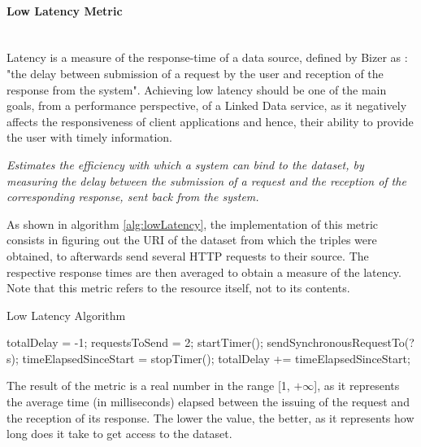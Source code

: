 \paragraph{Low Latency Metric} ~\\ %
Latency is a measure of the response-time of a data source, defined by Bizer as \cite{Bizer2008:PhDThesis:biblatex}: "the delay between submission of a request by the user and reception of the response from the system". Achieving low latency should be one of the main goals, from a performance perspective, of a Linked Data service, as it negatively affects the responsiveness of client applications and hence, their ability to provide the user with timely information.
\begin{mdframed}[style=metricdefinition]
\emph{Estimates the efficiency with which a system can bind to the dataset, by measuring the delay between the submission of a request  and the reception of the corresponding response, sent back from the system.}
\end{mdframed}

As shown in algorithm \ref{alg:lowLatency}, the implementation of this metric consists in figuring out the URI of the dataset from which the triples were obtained, to afterwards send several HTTP requests to their source. The respective response times are then averaged to obtain a measure of the latency. Note that this metric refers to the resource itself, not to its contents.
\begin{algorithm}
\caption{Low Latency Algorithm} \label{alg:lowLatency}
\begin{algorithmic}[1]
\State totalDelay = -1;
\State requestsToSend = 2;
\EndProcedure
{}
\State startTimer();
\State sendSynchronousRequestTo(?s);
\EndFor
\State timeElapsedSinceStart = stopTimer();
\State totalDelay += timeElapsedSinceStart;
\EndIf
{}
\EndProcedure
\end{algorithmic}
\end{algorithm}
The result of the metric is a real number in the range [1, $+\infty$], as it represents the average time (in  milliseconds) elapsed between the issuing of the request and the reception of its response. The lower the value, the better, as it represents how long does it take to get access to the dataset.

